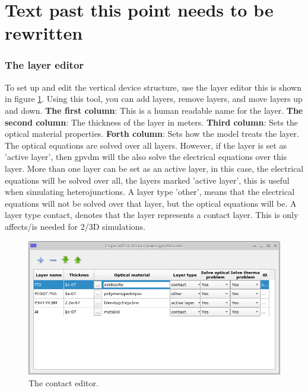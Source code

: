 
\section{Text past this point needs to be rewritten}
\subsubsection{The layer editor}
To set up and edit the vertical device structure, use the layer editor this is shown in figure \ref{fig:layer_editor}. Using this tool, you can add layers, remove layers, and move layers up and down.
\linebreak
\linebreak 
\textbf{The first column}: This is a human readable name for the layer.
\linebreak 
\linebreak 
\textbf{The second column}: The thickness of the layer in meters.
\linebreak
\linebreak 
\textbf{Third column}: Sets the optical material properties.
\linebreak
\linebreak 
\textbf{Forth column}: Sets how the model treats the layer.  The optical equations are solved over all layers.  However, if the layer is set as 'active layer', then gpvdm will the also solve the electrical equations over this layer.  More than one layer can be set as an active layer, in this case, the electrical equations will be solved over all, the layers marked 'active layer', this is useful when simulating heterojunctions.  A layer type 'other', means that the electrical equations will not be solved over that layer, but the optical equations will be.  A layer type contact, denotes that the layer represents a contact layer.  This is only affects/is needed for 2/3D simulations.


\begin{figure}[ht!]
\centering
\includegraphics[width=\textwidth]{./images/layer_editor.png}
{\caption{The contact editor.}}
\label{fig:layer_editor}
\end{figure}

